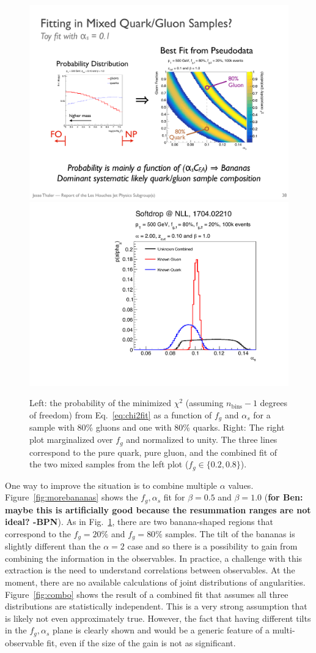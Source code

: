 \begin{figure}[h!]
\begin{center}
\includegraphics[width = 0.49\columnwidth]{figures/banana.pdf}\includegraphics[width = 0.42\columnwidth]{figures/palpha_alpha_2_0beta_1_0_zcut_0_100.pdf}
\end{center}
\caption{Left: the probability of the minimized $\chi^2$ (assuming $n_\text{bins}-1$ degrees of freedom) from Eq.~\ref{eq:chi2fit} as a function of $f_g$ and $\alpha_s$ for a sample with 80\% gluons and one with 80\% quarks.  Right: The right plot marginalized over $f_g$ and normalized to unity.  The three lines correspond to the pure quark, pure gluon, and the combined fit of the two mixed samples from the left plot ($f_g\in\{0.2,0.8\}$).}
\label{fig:alpha2fit}
\end{figure}

One way to improve the situation is to combine multiple $\alpha$ values.  Figure~\ref{fig:morebananas} shows the $f_g,\alpha_s$ fit for $\beta = 0.5$ and $\beta=1.0$ (\textbf{for Ben: maybe this is artificially good because the resummation ranges are not ideal? -BPN}).  As in Fig.~\ref{fig:alpha2fit}, there are two banana-shaped regions that correspond to the $f_g=20\%$ and $f_g=80\%$ samples.   The tilt of the bananas is slightly different than the $\alpha=2$ case and so there is a possibility to gain from combining the information in the observables.  In practice, a challenge with this extraction is the need to understand correlations between observables.  At the moment, there are no available calculations of joint distributions of angularities.  Figure~\ref{fig:combo} shows the result of a combined fit that assumes all three distributions are statistically independent.  This is a very strong assumption that is likely not even approximately true.  However, the fact that having different tilts in the $f_g,\alpha_s$ plane is clearly shown and would be a generic feature of a multi-observable fit, even if the size of the gain is not as significant. 

